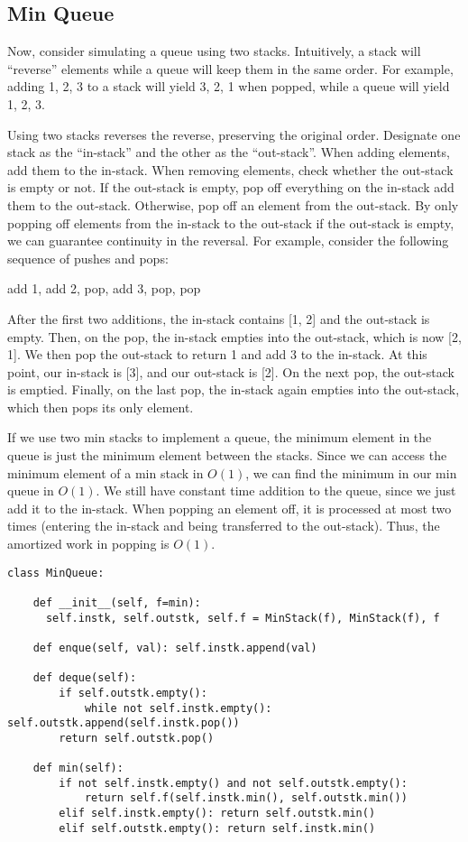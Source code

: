 \documentclass[11pt, oneside]{article}
\begin{document}
\subsection{Min Queue}
Now, consider simulating a queue using two stacks. Intuitively, a stack will ``reverse'' elements while a queue will keep them in the same order. For example, adding 1, 2, 3 to a stack will yield 3, 2, 1 when popped, while a queue will yield 1, 2, 3.

Using two stacks reverses the reverse, preserving the original order.
Designate one stack as the ``in-stack'' and the other as the ``out-stack''.
When adding elements, add them to the in-stack.
When removing elements, check whether the out-stack is empty or not.
If the out-stack is empty, pop off everything on the in-stack add them to the out-stack.
Otherwise, pop off an element from the out-stack. By only popping off elements
from the in-stack to the out-stack if the out-stack is empty, we can guarantee
continuity in the reversal. For example, consider the following sequence of pushes and pops:

\begin{center}
add 1, add 2, pop, add 3, pop, pop
\end{center}

After the first two additions, the in-stack contains [1, 2] and the out-stack is empty.
Then, on the pop, the in-stack empties into the out-stack, which is now [2, 1].
We then pop the out-stack to return 1 and add 3 to the in-stack. At this point, our in-stack is [3], and our out-stack is [2]. On the next pop, the out-stack is emptied. Finally, on the last pop,
the in-stack again empties into the out-stack, which then pops its only element.

If we use two min stacks to implement a queue, the minimum element in the queue is
just the minimum element between the stacks. Since we can access the minimum element of a min stack
in \( O(1) \), we can find the minimum in our min queue in \( O(1) \).
We still have constant time addition to the queue, since we just add it to the in-stack.
When popping an element off, it is processed at most two times (entering the in-stack and being transferred to the out-stack). Thus, the amortized work in popping is \( O(1) \).

\begin{verbatim}
class MinQueue:

    def __init__(self, f=min):
      self.instk, self.outstk, self.f = MinStack(f), MinStack(f), f

    def enque(self, val): self.instk.append(val)

    def deque(self):
        if self.outstk.empty():
            while not self.instk.empty(): self.outstk.append(self.instk.pop())
        return self.outstk.pop()

    def min(self):
        if not self.instk.empty() and not self.outstk.empty():
            return self.f(self.instk.min(), self.outstk.min())
        elif self.instk.empty(): return self.outstk.min()
        elif self.outstk.empty(): return self.instk.min()
\end{verbatim}
\end{document}

